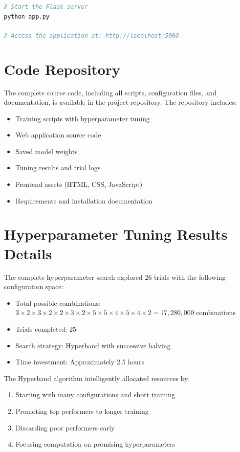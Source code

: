 \documentclass[12pt,a4paper]{article}
\begin{document}
\begin{lstlisting}[language=bash, caption={Web Application Launch}]
# Start the Flask server
python app.py

# Access the application at: http://localhost:5000
\end{lstlisting}

\section{Code Repository}

The complete source code, including all scripts, configuration files, and documentation, is available in the project repository. The repository includes:

\begin{itemize}
    \item Training scripts with hyperparameter tuning
    \item Web application source code
    \item Saved model weights
    \item Tuning results and trial logs
    \item Frontend assets (HTML, CSS, JavaScript)
    \item Requirements and installation documentation
\end{itemize}

\section{Hyperparameter Tuning Results Details}

The complete hyperparameter search explored 26 trials with the following configuration space:

\begin{itemize}
    \item Total possible combinations: $3 \times 2 \times 3 \times 2 \times 2 \times 3 \times 2 \times 5 \times 5 \times 4 \times 5 \times 4 \times 2 = 17,280,000$ combinations
    \item Trials completed: 25
    \item Search strategy: Hyperband with successive halving
    \item Time investment: Approximately 2.5 hours
\end{itemize}

The Hyperband algorithm intelligently allocated resources by:
\begin{enumerate}
    \item Starting with many configurations and short training
    \item Promoting top performers to longer training
    \item Discarding poor performers early
    \item Focusing computation on promising hyperparameters
\end{enumerate}
\end{document}
